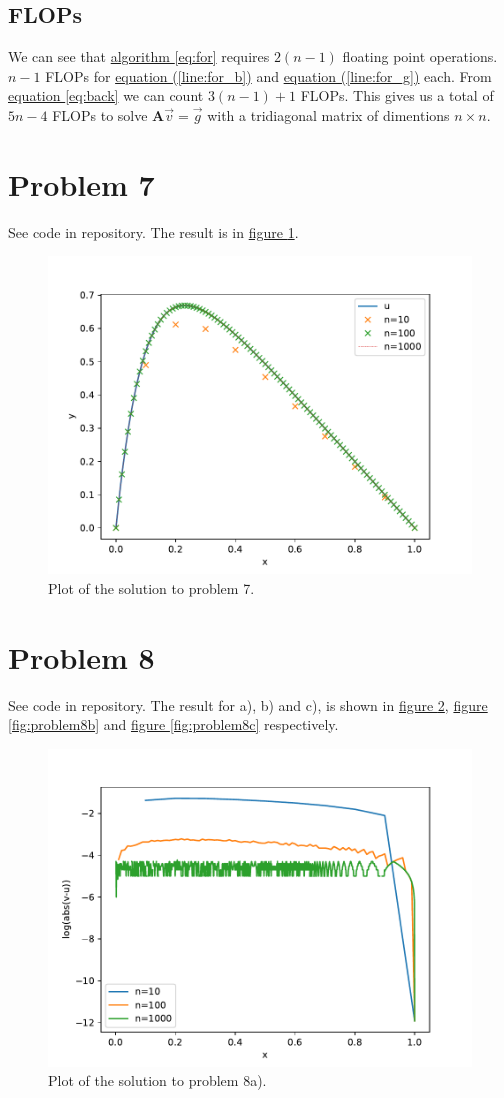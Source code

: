 \documentclass[english,notitlepage]{article}  %
\begin{document}
  \subsection*{FLOPs}

    We can see that \hyperref[eq:for]{algorithm \ref*{eq:for}} requires $2(n-1)$ floating point operations. $n-1$ FLOPs for \hyperref[line:for_b]{equation (\ref*{line:for_b})} and \hyperref[line:for_g]{equation (\ref*{line:for_g})} each. From \hyperref[eq:back]{equation \ref*{eq:back}} we can count $3(n-1) + 1$ FLOPs. This gives us a total of $5n - 4$ FLOPs to solve $\boldsymbol{A}\vec{v} = \vec{g}$ with a tridiagonal matrix of dimentions $n\times n$.

\section*{Problem 7}

See code in repository. The result is in \hyperref[fig:problem7]{figure \ref*{fig:problem7}}.

\begin{figure}[H]
  \centering
  \includegraphics[width=0.6\linewidth]{../Code/Problem_7_plot.pdf}
  \caption{Plot of the solution to problem 7.}
  \label{fig:problem7}
\end{figure}

\section*{Problem 8}

See code in repository. The result for a), b) and c), is shown in
\hyperref[fig:problem8a]{figure \ref*{fig:problem8a}},
\hyperref[fig:problem8b]{figure \ref*{fig:problem8b}} and
\hyperref[fig:problem8c]{figure \ref*{fig:problem8c}} respectively.

\begin{figure}[H]
  \centering
  \includegraphics[width=0.6\linewidth]{../Code/log10_abs_err.pdf}
  \caption{Plot of the solution to problem 8a).}
  \label{fig:problem8a}
\end{figure}
\end{document}
